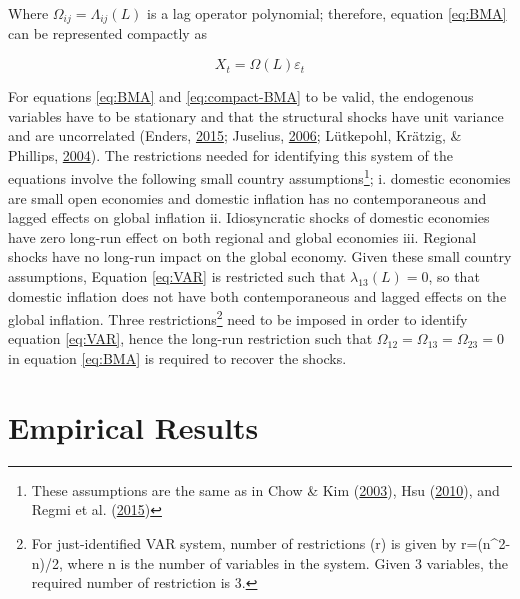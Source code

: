 \documentclass[]{article}
\let\rmarkdownfootnote\footnote%
\def\footnote{\protect\rmarkdownfootnote}
\begin{document}
Where \(\Omega_{ij}=\Lambda_{ij}(L)\) is a lag operator polynomial; therefore, equation \eqref{eq:BMA} can be represented compactly as

\begin{equation}
X_{t}=\Omega (L) \varepsilon_t
\label{eq:compact-BMA}
\end{equation}

For equations \eqref{eq:BMA} and \eqref{eq:compact-BMA} to be valid, the endogenous variables have to be stationary and that the structural shocks have unit variance and are uncorrelated (Enders, \protect\hyperlink{ref-enders2015applied}{2015}; Juselius, \protect\hyperlink{ref-juselius2006cointegrated}{2006}; Lütkepohl, Krätzig, \& Phillips, \protect\hyperlink{ref-lutkepohl2004applied}{2004}). The restrictions needed for identifying this system of the equations involve the following small country assumptions\footnote{These assumptions are the same as in Chow \& Kim (\protect\hyperlink{ref-Chow2003}{2003}), Hsu (\protect\hyperlink{ref-hsu2010common}{2010}), and Regmi et al. (\protect\hyperlink{ref-Regmi2015}{2015})}; i. domestic economies are small open economies and domestic inflation has no contemporaneous and lagged effects on global inflation ii. Idiosyncratic shocks of domestic economies have zero long-run effect on both regional and global economies iii. Regional shocks have no long-run impact on the global economy. Given these small country assumptions, Equation \eqref{eq:VAR} is restricted such that \(\lambda_{13} (L)=0\), so that domestic inflation does not have both contemporaneous and lagged effects on the global inflation. Three restrictions\footnote{For just-identified VAR system, number of restrictions (r) is given by r=(n\^{}2-n)/2, where n is the number of variables in the system. Given 3 variables, the required number of restriction is 3. } need to be imposed in order to identify equation \eqref{eq:VAR}, hence the long-run restriction such that \(\Omega_{12}=\Omega_{13}=\Omega_{23}=0\) in equation \eqref{eq:BMA} is required to recover the shocks.

\hypertarget{empirical-results}{%
\section{Empirical Results}\label{empirical-results}}
\end{document}
